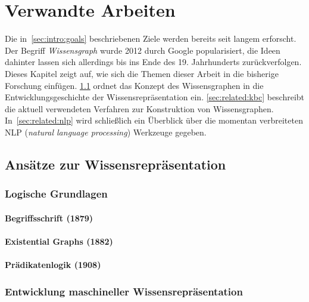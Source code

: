 %
\chapter{Verwandte Arbeiten}
\label{sec:related}

Die in~\ref{sec:intro:goals} beschriebenen Ziele werden bereits seit langem erforscht.
Der Begriff \textit{Wissensgraph} wurde 2012 durch Google popularisiert, die Ideen dahinter lassen sich allerdings bis ins Ende des 19. Jahrhunderts zurückverfolgen.
Dieses Kapitel zeigt auf, wie sich die Themen dieser Arbeit in die bisherige Forschung einfügen.
\ref{sec:related:kr} ordnet das Konzept des Wissensgraphen in die Entwicklungsgeschichte der Wissensrepräsentation ein.
\ref{sec:related:kbc} beschreibt die aktuell verwendeten Verfahren zur Konstruktion von Wissensgraphen.
In~\ref{sec:related:nlp} wird schließlich ein Überblick über die momentan verbreiteten NLP (\textit{natural language processing}) Werkzeuge gegeben.

\section{Ansätze zur Wissensrepräsentation}
\label{sec:related:kr}

\subsection{Logische Grundlagen}
\label{sec:related:kr:logic}

\subsubsection{Begriffsschrift (1879)}
\label{sec:related:kr:logic:begriff}

\subsubsection{Existential Graphs (1882)}
\label{sec:related:kr:logic:eg}

\subsubsection{Prädikatenlogik (1908)}
\label{sec:related:kr:logic:pred}

\subsection{Entwicklung maschineller Wissensrepräsentation}
\label{sec:related:kr:history}

